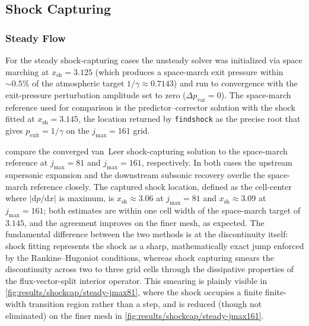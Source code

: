 \subsection{Shock Capturing} \label{sec:results/shock-capturing}

\subsubsection{Steady Flow} \label{sec:results/shock-capturing/steady-flow}

For the steady shock-capturing cases the unsteady solver was initialized via space marching at \(x_\text{sh} = 3.125\) (which produces a space-march exit pressure within \(\sim 0.5\%\) of the atmospheric target \(1/\gamma \approx 0.7143\)) and run to convergence with the exit-pressure perturbation amplitude set to zero (\(\Delta p_\text{var} = 0\)). The space-march reference used for comparison is the predictor--corrector solution with the shock fitted at \(x_\text{sh} = 3.145\), the location returned by \texttt{findshock} as the precise root that gives \(p_\text{exit} = 1/\gamma\) on the \(j_\text{max} = 161\) grid.

 compare the converged van~Leer shock-capturing solution to the space-march reference at \(j_\text{max} = 81\) and \(j_\text{max} = 161\), respectively. In both cases the upstream supersonic expansion and the downstream subsonic recovery overlie the space-march reference closely. The captured shock location, defined as the cell-center where \(\left|\mathrm{d}p/\mathrm{d}x\right|\) is maximum, is \(x_\text{sh} \approx 3.06\) at \(j_\text{max} = 81\) and \(x_\text{sh} \approx 3.09\) at \(j_\text{max} = 161\); both estimates are within one cell width of the space-march target of \(3.145\), and the agreement improves on the finer mesh, as expected. The fundamental difference between the two methods is at the discontinuity itself: shock fitting represents the shock as a sharp, mathematically exact jump enforced by the Rankine--Hugoniot conditions, whereas shock capturing smears the discontinuity across two to three grid cells through the dissipative properties of the flux-vector-split interior operator. This smearing is plainly visible in \cref{fig:results/shockcap/steady-jmax81}, where the shock occupies a finite finite-width transition region rather than a step, and is reduced (though not eliminated) on the finer mesh in \cref{fig:results/shockcap/steady-jmax161}.

